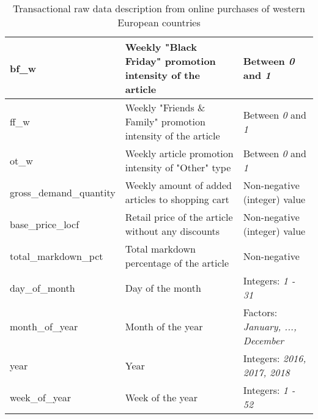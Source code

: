 \begin{table}[H]
\begin{adjustbox}{max width=\textwidth}
\begin{tabular}{|l|l|l|}
 \hline
bf\_w                   & Weekly "Black Friday" promotion intensity of the article                                                                    & Between \textit{0} and \textit{1}              \\ \hline
ff\_w                   & Weekly "Friends \& Family" promotion intensity of the article                                                               & Between \textit{0} and \textit{1}              \\ \hline
ot\_w                   & Weekly article promotion intensity of "Other" type                                                                          & Between \textit{0} and \textit{1}              \\ \hline
gross\_demand\_quantity & Weekly amount of added articles to shopping cart                                                                            & Non-negative (integer) value \\ \hline
base\_price\_locf       & Retail price of the article without any discounts                                                                           & Non-negative (integer) value \\ \hline
total\_markdown\_pct    &                                                                                                          Total markdown percentage of the article &    Non-negative                           \\ \hline
day\_of\_month          & Day of the month                                                                                                            & Integers: \textit{1 - 31}                       \\ \hline
month\_of\_year         & Month of the year                                                                                                           & Factors: \textit{January, ..., December}       \\ \hline
year                    & Year                                                                                                                        & Integers: \textit{2016, 2017, 2018}             \\ \hline
week\_of\_year          & Week of the year                                                                                                            & Integers: \textit{1 - 52}                       \\ \hline
\end{tabular}
\end{adjustbox}
\caption{Transactional raw data description from online purchases of western European countries}
\label{tab:transactional_data}
\end{table}

